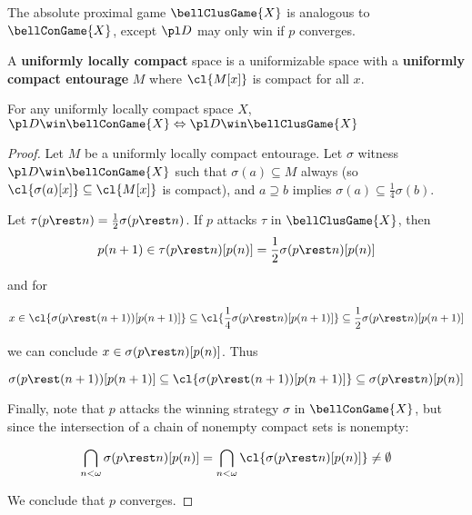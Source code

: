 \newpage

\begin{defn}
  The absolute proximal game $\bellClusGame{X}$ is analogous to $\bellConGame{X}$, except $\pl D$ may only win if $p$ converges.
\end{defn}

\begin{defn}
  A \textbf{uniformly locally compact} space is a uniformizable space with a \textbf{uniformly compact entourage} $M$ where $\cl{M[x]}$ is compact for all $x$.
\end{defn}

\begin{thm}
  For any uniformly locally compact space $X$,
      $\pl D\win \bellConGame{X} \Leftrightarrow \pl D\win \bellClusGame{X}$
\end{thm}

\begin{proof}
  Let $M$ be a uniformly locally compact entourage. Let $\sigma$ witness $\pl D\win \bellConGame{X}$ such that $\sigma(a)\subseteq M$ always (so $\cl{\sigma(a)[x]}\subseteq\cl{M[x]}$ is compact), and $a\supseteq b$  implies $\sigma(a)\subseteq\frac{1}{4}\sigma(b)$.

  Let $\tau(p\rest n)=\frac{1}{2}\sigma(p\rest n)$. If $p$ attacks $\tau$ in $\bellClusGame{X}$, then
    \[
      p(n+1)
        \in
      \tau(p\rest n)[p(n)]
        =
      \frac{1}{2}\sigma(p\rest n)[p(n)]
    \]

    and for

    \[
      x
        \in
      \cl{\sigma(p\rest (n+1))[p(n+1)]}
        \subseteq
      \cl{\frac{1}{4}\sigma(p\rest n)[p(n+1)]}
        \subseteq
      \frac{1}{2}\sigma(p\rest n)[p(n+1)]
    \]

  we can conclude $x\in\sigma(p\rest n)[p(n)]$. Thus

    \[
      \sigma(p\rest (n+1))[p(n+1)]
        \subseteq
      \cl{\sigma(p\rest (n+1))[p(n+1)]}
        \subseteq
      \sigma(p\rest n)[p(n)]
    \]

  Finally, note that $p$ attacks the winning strategy $\sigma$ in $\bellConGame{X}$, but since the intersection of a chain of nonempty compact sets is nonempty:

    \[
      \bigcap_{n<\omega} \sigma(p\rest n)[p(n)]
        =
      \bigcap_{n<\omega} \cl{\sigma(p\rest n)[p(n)]}
        \not=
      \emptyset
    \]

  We conclude that $p$ converges.
\end{proof}

